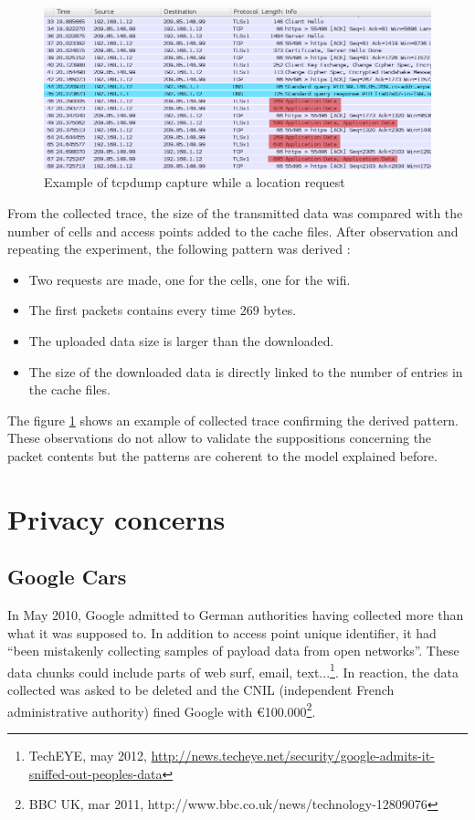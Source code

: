 \begin{figure}[h]
  \hspace*{-2cm}
  \centering
  \includegraphics[width=17cm]{images/trace2.png}
  \caption{Example of tcpdump capture while a location request}
  \label{fig:loc-req-tcpdump}
\end{figure}

From the collected trace, the size of the transmitted data was compared with the number of cells and access points added to the cache files.
After observation and repeating the experiment, the following pattern was derived :

\begin{itemize}
\item Two requests are made, one for the cells, one for the wifi.
\item The first packets contains every time 269 bytes.
\item The uploaded data size is larger than the downloaded.
\item The size of the downloaded data is directly linked to the number of entries in the cache files.
\end{itemize}

The figure \ref{fig:loc-req-tcpdump} shows an example of collected trace confirming the derived pattern.
These observations do not allow to validate the suppositions concerning the packet contents but the patterns are coherent to the model explained before.


\section{Privacy concerns}
\subsection{Google Cars}
In May 2010, Google admitted to German authorities having collected more than what it was supposed to.
In addition to access point unique identifier, it had ``been mistakenly collecting samples of payload data from open networks''.
These data chunks could include parts of web surf, email, text...\footnote{TechEYE, may 2012, \url{http://news.techeye.net/security/google-admits-it-sniffed-out-peoples-data}}.
In reaction, the data collected was asked to be deleted and the CNIL (independent French administrative authority) fined Google with €100.000\footnote{BBC UK, mar 2011, http://www.bbc.co.uk/news/technology-12809076}.\\

